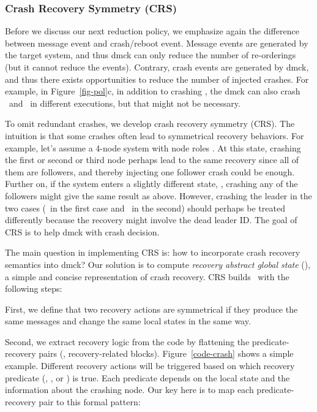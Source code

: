 


\subsubsection{Crash Recovery Symmetry (CRS)}
\label{sam-crs}


Before we discuss our next reduction policy, we emphasize again the
difference between message event and crash/reboot event.  Message
events are generated by the target system, and thus dmck can only
reduce the number of re-orderings (but it cannot reduce the events).
Contrary, crash events are generated by dmck, and thus there exists
opportunities to reduce the number of injected crashes.  For example,
in Figure~\ref{fig-pol}c, in addition to crashing \ftri, the dmck can
also crash \fone\ and \ftwo\ in different executions, but that might
not be necessary.



To omit redundant crashes, we develop crash recovery symmetry (CRS).
The intuition is that some crashes often lead to symmetrical recovery
behaviors.  For example, let's assume a 4-node system with node
roles .  At this state, crashing the first or second or third
node perhaps lead to the same recovery since all of them are
followers, and thereby injecting one follower crash could be enough.
Further on, if the system enters a slightly different
state, , crashing any of the followers might give the same
result as above.  However, crashing the leader in the two cases
(\nfour\ in the first case and \ntri\ in the second) should perhaps be
treated differently because the recovery might involve the dead leader
ID.  The goal of CRS is to help dmck with crash decision.


The main question in implementing CRS is: how to incorporate crash
recovery semantics into dmck?  Our solution is to compute {\em recovery
abstract global state} (\rags), a simple and concise representation of
crash recovery.  CRS builds \rags\ with the following steps:

First, we define that two recovery actions are symmetrical if they
produce the same messages and change the same local states in the same
way.

Second, we extract recovery logic from the code by flattening the
predicate-recovery pairs (\ie, recovery-related  blocks).
Figure~\ref{code-crash} shows a simple example.  Different recovery
actions will be triggered based on which recovery predicate
(\prone, \prtwo, or \prtri) is true.  Each predicate depends on the
local state and the information about the crashing node.  Our key here
is to map each predicate-recovery pair to this formal pattern:


